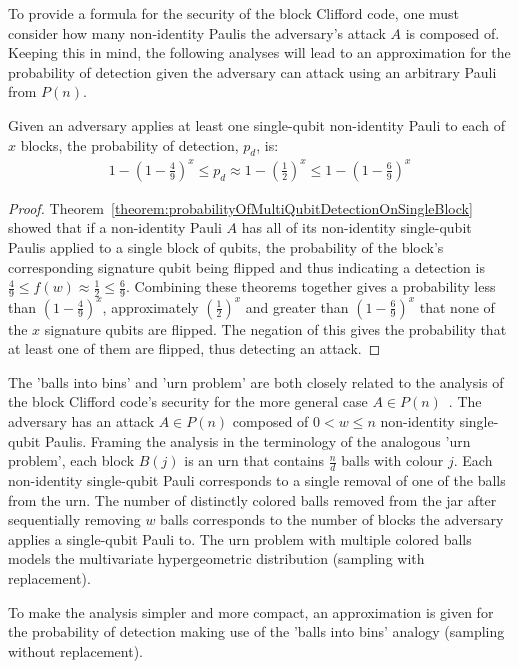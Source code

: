 To provide a formula for the security of the block Clifford code, one must consider how many non-identity Paulis the adversary's attack $A$ is composed of. Keeping this in mind, the following analyses will lead to an approximation for the probability of detection given the adversary can attack using an arbitrary Pauli from $P(n)$.
\begin{corollary}
\label{corollary:adversaryAttacksKblocks}
Given an adversary applies at least one single-qubit non-identity Pauli to each of $x$ blocks, the probability of detection, $p_d$, is:
\begin{align}
1 - (1-\frac{4}{9})^x \leq p_d \approx 1 - (\frac{1}{2})^x \leq 1 - (1-\frac{6}{9})^x
\end{align}
\end{corollary}
\begin{proof}
Theorem~\ref{theorem:probabilityOfMultiQubitDetectionOnSingleBlock} showed that if a non-identity Pauli $A$ has all of its non-identity single-qubit Paulis applied to a single block of qubits, the probability of the block's corresponding signature qubit being flipped and thus indicating a detection is $\frac{4}{9} \leq f(w) \approx \frac{1}{2} \leq \frac{6}{9}$. Combining these theorems together gives a probability less than $(1-\frac{4}{9})^{x}$, approximately $(\frac{1}{2})^{x}$  and greater than $(1-\frac{6}{9})^{x}$ that none of the $x$ signature qubits are flipped. The negation of this gives the probability that at least one of them are flipped, thus detecting an attack.
\end{proof}

The 'balls into bins' and 'urn problem' are both closely related to the analysis of the block Clifford code's security for the more general case $A \in P(n)$~\cite{BallsIntoBinsProblemWiki,UrnProblemWiki}. The adversary has an attack $A \in P(n)$ composed of $0 < w \leq n$ non-identity single-qubit Paulis. Framing the analysis in the terminology of the analogous 'urn problem', each block $B(j)$ is an urn that contains $\frac{n}{d}$ balls with colour $j$. Each non-identity single-qubit Pauli corresponds to a single removal of one of the balls from the urn. The number of distinctly colored balls removed from the jar after sequentially removing $w$ balls corresponds to the number of blocks the adversary applies a single-qubit Pauli to. The urn problem with multiple colored balls models the multivariate hypergeometric distribution (sampling with replacement).

To make the analysis simpler and more compact, an approximation is given for the probability of detection making use of the 'balls into bins' analogy (sampling without replacement).

